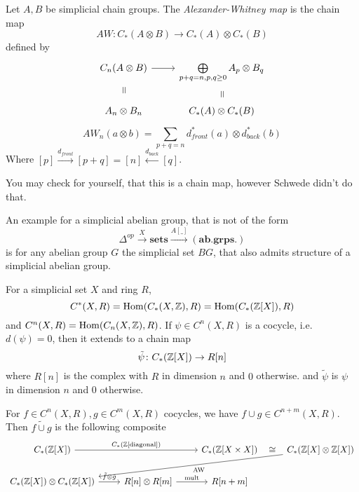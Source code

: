 \documentclass[language=english]{TemplateLecture}
\begin{document}
\begin{construction}
    Let \(A,B\) be simplicial chain groups. The \emph{Alexander-Whitney map} is the chain map
    \[AW\colon C_*(A\otimes B) \to C_*(A) \otimes C_*(B)\]
    defined by
    \[\begin{tikzcd}
        C_n(A\otimes B) \ar[d, phantom, sloped, "="]\ar[r] & \bigoplus\limits_{p+q = n, p,q \geq 0} A_p \otimes B_q \ar[d, phantom, sloped, "="] \\
        A_n \otimes B_n & C_*(A) \otimes C_*(B)
    \end{tikzcd}\]
    \[AW_n(a\otimes b) = \sum_{p+q = n} d_{front}^*(a) \otimes d_{back}^*(b)\]
    Where \([p] \xrightarrow{d_{front}} [p+q] = [n] \xleftarrow{d_{back}} [q]\).

    You may check for yourself, that this is a chain map, however Schwede didn't do that.
\end{construction}



\begin{Remark}
    An example for a simplicial abelian group, that is not of the form
    \[\Delta^{op} \xrightarrow{X} \mathbf{sets} \xrightarrow{A[\_]} (\mathbf{ab. grps.})\]
    is for any abelian group \(G\) the simplicial set \(BG\), that also admits structure of a simplicial abelian group.
\end{Remark}

\begin{remark}
    For a simplicial set \(X\) and ring \(R\),
    \[C^*(X,R) = \operatorname{Hom}(C_*(X,\mathbb{Z}), R) = \operatorname{Hom} (C_*(\mathbb{Z}[X]),R)\]
    and \(C^n(X,R) = \operatorname{Hom}(C_n(X,\mathbb{Z}), R)\).
    If \(\psi \in C^n(X,R)\) is a cocycle, i.e. \(d(\psi) = 0\), then it extends to a chain map
    \[\tilde{\psi}\colon C_*(\mathbb{Z}[X]) \to R[n]\]
    where \(R[n]\) is the complex with \(R\) in dimension \(n\) and \(0\) otherwise.
    and \(\tilde{\psi}\) is \(\psi\) in dimension \(n\) and \(0\) otherwise.

    For \(f \in C^n(X,R), g\in C^m(X,R)\) cocycles, we have \(f\cup g \in C^{n+m}(X,R)\). Then \(\tilde{f\cup g}\) is the following composite
    \[\begin{tikzcd}
        {C_*(\IZ[X])} \ar[rr, "{C_*(\IZ[\text{diagonal}])}"] && {C_*(\IZ[X \times X])} \ar[r, "\cong", phantom] & {C_*(\IZ[X] \otimes \IZ[X])} \ar[dlll, "\text{AW}"] \\
        {C_*(\IZ[X]) \otimes C_*(\IZ[X])} \ar[r, "\tilde{f} \otimes \tilde{g}"] & {R[n] \otimes R[m]} \ar[r, "\text{mult}"] & {R[n+m]} \\
    \end{tikzcd}\]
\end{remark}
\end{document}
